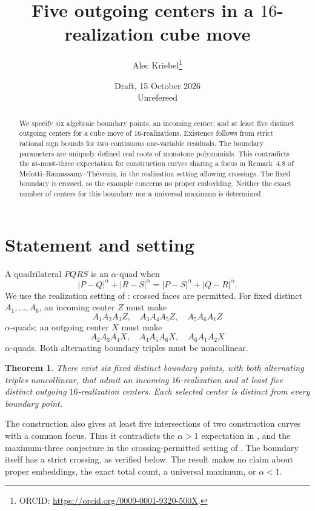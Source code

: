 \documentclass[11pt]{article}
\title{Five outgoing centers in a $16$-realization cube move}
\author{Alec Kriebel\thanks{ORCID: \url{https://orcid.org/0009-0001-9320-500X}.}}
\date{Draft, 15 October 2026\\\small Unrefereed}
\newtheorem{theorem}{Theorem}
\begin{document}
\maketitle
\begin{abstract}
We specify six algebraic boundary points, an incoming center, and at least five distinct outgoing centers for a cube move of $16$-realizations. Existence follows from strict rational sign bounds for two continuous one-variable residuals. The boundary parameters are uniquely defined real roots of monotone polynomials. This contradicts the at-most-three expectation for construction curves sharing a focus in Remark~4.8 of Melotti--Ramassamy--Th\'evenin, in the realization setting allowing crossings. The fixed boundary is crossed, so the example concerns no proper embedding. Neither the exact number of centers for this boundary nor a universal maximum is determined.
\end{abstract}

\section{Statement and setting}
A quadrilateral $PQRS$ is an $\alpha$-quad when
\[
 |P-Q|^\alpha+|R-S|^\alpha=|P-S|^\alpha+|Q-R|^\alpha.
\]
We use the realization setting of \cite[Definitions~2.1, 2.4--2.5]{MRT}: crossed faces are permitted. For fixed distinct $A_1,\ldots,A_6$, an incoming center $Z$ must make
\[
 A_1A_2A_3Z,\quad A_3A_4A_5Z,\quad A_5A_6A_1Z
\]
$\alpha$-quads; an outgoing center $X$ must make
\[
 A_2A_3A_4X,\quad A_4A_5A_6X,\quad A_6A_1A_2X
\]
$\alpha$-quads. Both alternating boundary triples must be noncollinear.

\begin{theorem}\label{thm:main}
There exist six fixed distinct boundary points, with both alternating triples noncollinear, that admit an incoming $16$-realization and at least five distinct outgoing $16$-realization centers. Each selected center is distinct from every boundary point.
\end{theorem}

The construction also gives at least five intersections of two construction curves with a common focus. Thus it contradicts the $\alpha>1$ expectation in \cite[Remark~4.8, p.~811]{MRT}, and the maximum-three conjecture in the crossing-permitted setting of \cite[p.~1785]{OWR}. The boundary itself has a strict crossing, as verified below. The result makes no claim about proper embeddings, the exact total count, a universal maximum, or $\alpha<1$.
\end{document}
